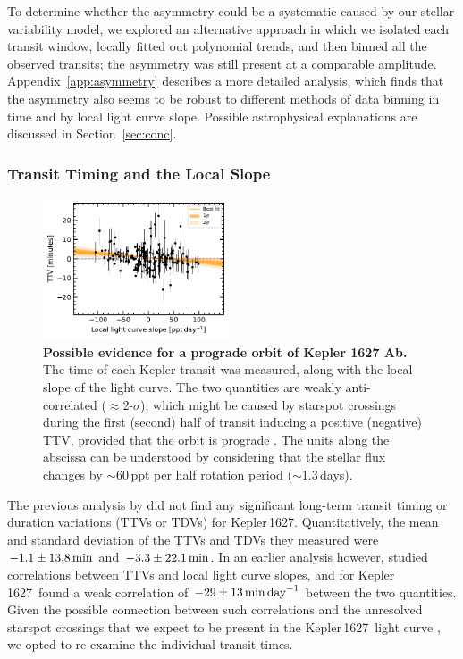 \documentclass[12pt,modern,twocolumn,tighten,linenumbers,trackchanges]{aastex63}
\newcommand{\sn}{Kepler\,1627} %
\begin{document}
To determine whether the asymmetry could be a systematic caused by our
stellar variability model, we explored an alternative approach in
which we isolated each transit window, locally fitted out
polynomial trends, and then binned all the observed transits; the
asymmetry was still present at a comparable amplitude.
Appendix~\ref{app:asymmetry} describes a more detailed analysis, which finds
that the asymmetry also seems to be robust to different methods of
data binning in time and by local light curve slope.  Possible
astrophysical explanations are discussed in Section~\ref{sec:conc}.

\subsubsection{Transit Timing and the Local Slope}
\label{subsec:ttvslope}

\begin{figure}[tp]
	\begin{center}
		\leavevmode
		\includegraphics[width=0.49\textwidth]{f6.pdf}
	\end{center}
	\vspace{-0.6cm}
	\caption{
    {\bf Possible evidence for a prograde orbit of Kepler 1627 Ab.} The time of
    each Kepler transit was measured, along with the local slope of
    the light curve.  The two quantities are weakly anti-correlated
    ($\approx$2-$\sigma$), which
    might be caused by starspot crossings during the first
    (second) half of transit inducing a positive (negative) TTV,
    provided that the orbit is prograde \citep{mazeh_time_2015}.  The
    units along the abscissa can be understood by considering that the
    stellar flux changes by $\sim$60\,ppt per half rotation period
    ($\sim$1.3\,days).
		\label{fig:corr}
	}
\end{figure}


The previous analysis by \citet{holczer_transit_2016} did not
find any significant long-term transit timing or duration variations
(TTVs or TDVs) for \sn.  Quantitatively, the mean and standard deviation of the
TTVs and TDVs they measured were $-1.1\pm13.8\,{\rm
min}$ and $-3.3\pm22.1\,{\rm min}$.  In an
earlier analysis however, \citet{holczer_time_2015} studied correlations
between TTVs and local light curve slopes, and for \sn\
found a weak correlation of $-29\pm13\,{\rm min}\,{\rm day}^{-1}$
between the two quantities.  Given the possible connection between such
correlations and the unresolved starspot crossings that we expect to
be present in the \sn\ light curve \citep{mazeh_time_2015}, we opted to re-examine the
individual transit times.
\end{document}
